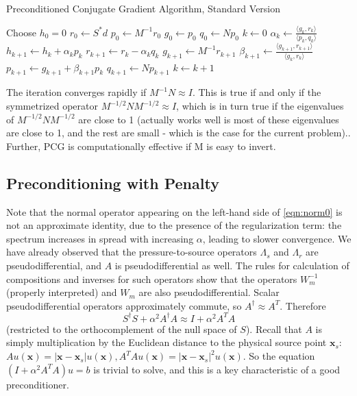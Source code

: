 \documentclass[georeport,12pt]{geophysics}
\newcommand{\bx}{\mathbf{x}}
\begin{document}
\begin{algorithm}[H]
\caption{Preconditioned Conjugate Gradient Algorithm, Standard Version}
\begin{algorithmic}[1]
\State Choose $h_0=0$ 
  \State $r_0 \gets S^*d$
  \State $p_0 \gets M^{-1} r_0$
  \State $g_0 \gets p_0$
  \State $q_0 \gets Np_0$
  \State $k \gets 0$
  \Repeat
  \State $\alpha_k \gets \frac{\langle g_k,r_k \rangle}{\langle p_k,q_k\rangle}$
  \State $h_{k+1} \gets h_k + \alpha_k p_k$
  \State $r_{k+1} \gets r_k - \alpha_kq_k$
  \State $g_{k+1} \gets M^{-1} r_{k+1}$
  \State $\beta_{k+1} \gets \frac{\langle g_{k+1},r_{k+1}\rangle}{\langle g_k,r_k\rangle}$
  \State $p_{k+1}\gets g_{k+1}+\beta_{k+1}p_k$
  \State $q_{k+1} \gets Np_{k+1}$
  \State $k \gets k+1$
\end{algorithmic}
\end{algorithm}
The iteration converges rapidly if $M^{-1}N \approx I$. This is true
if and only if the symmetrized operator $M^{-1/2}NM^{-1/2} \approx I$,
which is in turn true if the eigenvalues of $M^{-1/2}NM^{-1/2}$ are
close to 1 (actually works well is most of these eigenvalues are close
to 1, and the rest are small - which is the case for the current
problem)..  Further, PCG is computationally effective if M is easy to
invert.

\subsection{Preconditioning with Penalty}

Note that the normal operator appearing on the left-hand side of
\ref{eqn:norm0} is not an approximate identity, due to the presence of
the regularization term: the spectrum increases in spread with
increasing $\alpha$, leading to slower convergence. We have already
observed that the pressure-to-source operators $\Lambda_s$ and
$\Lambda_r$ are pseudodifferential, and $A$ is pseudodifferential as
well. The rules for calculation of
compositions and inverses for such operators show that the operators
$W_m^{-1}$ (properly interpreted) and $W_m$ are also pseudodifferential.
Scalar pseudodifferential operators approximately
commute, so $A^{\dagger} \approx A^T$. Therefore
\begin{equation}
  \label{eqn:normapprox}
  S^{\dagger}S + \alpha^2 A^{\dagger}A \approx I + \alpha^2A^TA
\end{equation}
(restricted to the orthocomplement of the null space of $S$).
Recall that $A$ is simply multiplication by the Euclidean distance to
the physical source point $\bx_s$: $A u (\bx) = |\bx-\bx_s|u(\bx),
A^TAu(\bx) = |\bx-\bx_s|^2u(\bx)$. So the equation $(I+\alpha^2
A^TA)u=b$ is trivial to solve, and this is a key characteristic of a
good preconditioner. 
\end{document}

